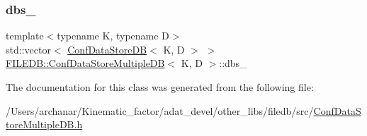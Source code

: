 \subsubsection{\texorpdfstring{dbs\_}{dbs\_}}
{\footnotesize\ttfamily template$<$typename K, typename D$>$ \\
std\+::vector$<$ \mbox{\hyperlink{classFILEDB_1_1ConfDataStoreDB}{Conf\+Data\+Store\+DB}}$<$ K, D $>$ $>$ \mbox{\hyperlink{classFILEDB_1_1ConfDataStoreMultipleDB}{F\+I\+L\+E\+D\+B\+::\+Conf\+Data\+Store\+Multiple\+DB}}$<$ K, D $>$\+::dbs\+\_\+\hspace{0.3cm}{\ttfamily [protected]}}



The documentation for this class was generated from the following file\+:\begin{DoxyCompactItemize}
\item 
/\+Users/archanar/\+Kinematic\+\_\+factor/adat\+\_\+devel/other\+\_\+libs/filedb/src/\mbox{\hyperlink{other__libs_2filedb_2src_2ConfDataStoreMultipleDB_8h}{Conf\+Data\+Store\+Multiple\+D\+B.\+h}}\end{DoxyCompactItemize}
